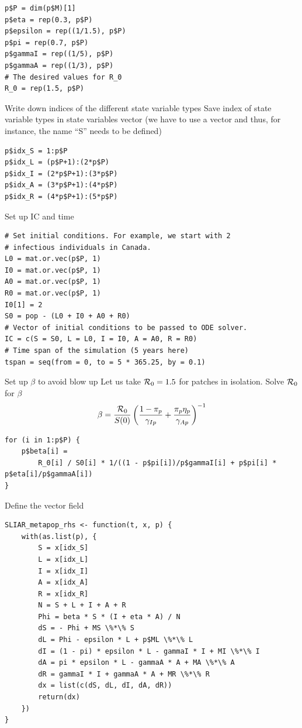 \documentclass[aspectratio=43]{beamer}
\begin{document}
\begin{frame}[fragile]
\begin{lstlisting}
p$P = dim(p$M)[1]
p$eta = rep(0.3, p$P)
p$epsilon = rep((1/1.5), p$P)
p$pi = rep(0.7, p$P)
p$gammaI = rep((1/5), p$P)
p$gammaA = rep((1/3), p$P)
# The desired values for R_0
R_0 = rep(1.5, p$P)
\end{lstlisting}	
\end{frame}

\begin{frame}[fragile]{Write down indices of the different state variable types}
	Save index of state variable types in state variables vector (we have to use a vector and thus, for instance, the name ``S'' needs to be defined)
\begin{lstlisting}
p$idx_S = 1:p$P
p$idx_L = (p$P+1):(2*p$P)
p$idx_I = (2*p$P+1):(3*p$P)
p$idx_A = (3*p$P+1):(4*p$P)
p$idx_R = (4*p$P+1):(5*p$P)
\end{lstlisting}	
\end{frame}

\begin{frame}[fragile]{Set up IC and time}
\begin{lstlisting}
# Set initial conditions. For example, we start with 2
# infectious individuals in Canada.
L0 = mat.or.vec(p$P, 1)
I0 = mat.or.vec(p$P, 1)
A0 = mat.or.vec(p$P, 1)
R0 = mat.or.vec(p$P, 1)
I0[1] = 2
S0 = pop - (L0 + I0 + A0 + R0)
# Vector of initial conditions to be passed to ODE solver.
IC = c(S = S0, L = L0, I = I0, A = A0, R = R0)
# Time span of the simulation (5 years here)
tspan = seq(from = 0, to = 5 * 365.25, by = 0.1)
\end{lstlisting}	
\end{frame}


\begin{frame}[fragile]{Set up $\beta$ to avoid blow up}
	Let us take $\mathcal{R}_0=1.5$ for patches in isolation. Solve $\mathcal{R}_0$ for $\beta$ 
	$$
	\beta=\frac{\mathcal{R}_0}{S(0)}
	\left(
	\frac{1-\pi_p}{\gamma_{Ip}}
	+\frac{\pi_p\eta_p}{\gamma_{Ap}}
	\right)^{-1}
	$$ 
\begin{lstlisting}
for (i in 1:p$P) {
	p$beta[i] = 
		R_0[i] / S0[i] * 1/((1 - p$pi[i])/p$gammaI[i] + p$pi[i] * p$eta[i]/p$gammaA[i])
}
\end{lstlisting}	
\end{frame}

\begin{frame}[fragile]{Define the vector field}
\begin{lstlisting}[language=Renhanced]
SLIAR_metapop_rhs <- function(t, x, p) {
	with(as.list(p), {
		S = x[idx_S]
		L = x[idx_L]
		I = x[idx_I]
		A = x[idx_A]
		R = x[idx_R]
		N = S + L + I + A + R
		Phi = beta * S * (I + eta * A) / N
		dS = - Phi + MS \%*\% S
		dL = Phi - epsilon * L + p$ML \%*\% L
		dI = (1 - pi) * epsilon * L - gammaI * I + MI \%*\% I
		dA = pi * epsilon * L - gammaA * A + MA \%*\% A
		dR = gammaI * I + gammaA * A + MR \%*\% R
		dx = list(c(dS, dL, dI, dA, dR))
		return(dx)
	})
}	
\end{lstlisting}
\end{frame}
	
\end{document}
